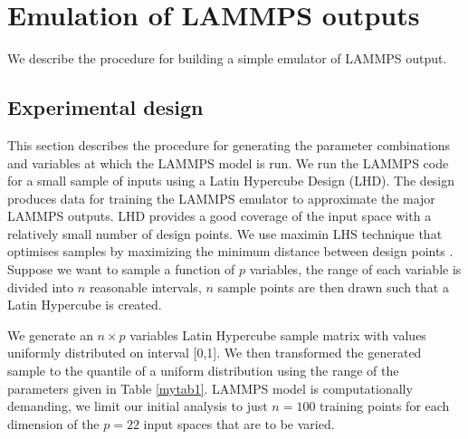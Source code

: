 \documentclass[12pt,titlepage]{report}
\theoremstyle{definition}
\theoremstyle{remark}
\begin{document}
\chapter{Emulation of LAMMPS outputs}
We describe the procedure for building a simple emulator of LAMMPS output.
\section{Experimental design}
This section describes the procedure for generating the parameter combinations and variables at which the LAMMPS model is run. We run the LAMMPS code for a small sample of inputs using a Latin Hypercube Design (LHD). The design produces data for training the LAMMPS emulator to approximate the major LAMMPS outputs. LHD provides a good coverage of the input space with a relatively small number of design points. We use maximin LHS technique that optimises samples by maximizing the minimum distance between design points \citet{pd5}. Suppose we want to sample a function of $p$ variables, the range of each variable is divided into $n$ reasonable intervals, $n$ sample points are then drawn such that a Latin Hypercube is created.

We generate an $n \times p$ variables Latin Hypercube sample matrix with values uniformly distributed on interval [0,1]. We then transformed the generated sample to the quantile of a uniform distribution using the range of the parameters given in Table \ref{mytab1}.  LAMMPS model is computationally demanding, we limit our initial analysis to just $n=100$ training points for each dimension of the $p=22$ input spaces that are to be varied. %

\end{document}
